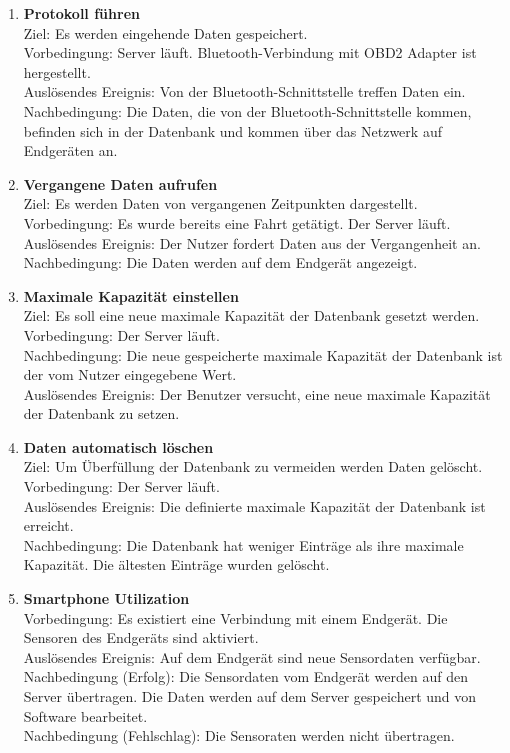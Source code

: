 \documentclass[pflichtenheft.tex]{subfiles}
\begin{document}
	\begin{enumerate}
		\setcounter{enumi}{\value{enumTemp}}
		\item{\textbf{Protokoll führen}} \\ Ziel: Es werden eingehende Daten gespeichert. \\ Vorbedingung: Server läuft. Bluetooth-Verbindung mit OBD2 Adapter ist hergestellt. \\ Auslösendes Ereignis: Von der Bluetooth-Schnittstelle treffen Daten ein. %
		Nachbedingung: Die Daten, die von der Bluetooth-Schnittstelle kommen, befinden sich in der Datenbank und kommen über das Netzwerk auf Endgeräten an.
		
		\item{\textbf{Vergangene Daten aufrufen}} \\ Ziel: Es werden Daten von vergangenen Zeitpunkten dargestellt. \\ Vorbedingung: Es wurde bereits eine Fahrt getätigt. Der Server läuft.\\ Auslösendes Ereignis: Der Nutzer fordert Daten aus der Vergangenheit an. \\ Nachbedingung: Die Daten werden auf dem Endgerät angezeigt.
	
		\item{\textbf{Maximale Kapazität einstellen}} \\ Ziel: Es soll eine neue maximale Kapazität der Datenbank gesetzt werden. \\ Vorbedingung: Der Server läuft. \\Nachbedingung: Die neue gespeicherte maximale Kapazität der Datenbank ist der vom Nutzer eingegebene Wert. \\Auslösendes Ereignis: Der Benutzer versucht, eine neue maximale Kapazität der Datenbank zu setzen. 
		
		\item{\textbf{Daten automatisch löschen}} \\ Ziel: Um Überfüllung der Datenbank zu vermeiden werden Daten gelöscht. \\ Vorbedingung: Der Server läuft. \\ Auslösendes Ereignis: Die definierte maximale Kapazität der Datenbank ist erreicht. \\ Nachbedingung: Die Datenbank hat weniger Einträge als ihre maximale Kapazität. Die ältesten Einträge wurden gelöscht.


		\item{\textbf{Smartphone Utilization}} \label{smartphoneutil} \\ Vorbedingung: Es existiert eine Verbindung mit einem Endgerät. Die Sensoren des Endgeräts sind aktiviert.\\ Auslösendes Ereignis: Auf dem Endgerät sind neue Sensordaten verfügbar. \\ Nachbedingung (Erfolg): Die Sensordaten vom Endgerät werden auf den Server übertragen. Die Daten werden auf dem Server gespeichert und von Software bearbeitet.\\  Nachbedingung (Fehlschlag): Die Sensoraten werden nicht übertragen.


\end{enumerate}
\end{document}
